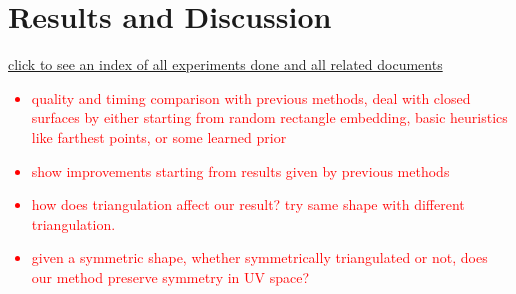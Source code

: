 \section{Results and Discussion}

\href{http://www.cs.ubc.ca/labs/imager/dgp/FracCuts/expResults/}{click to see an index of all experiments done and all related documents}

\textcolor{red}{
\begin{itemize}
\item quality and timing comparison with previous methods, deal with closed surfaces by either starting from random rectangle embedding, basic heuristics like farthest points, or some learned prior
\item show improvements starting from results given by previous methods
\item how does triangulation affect our result? try same shape with different triangulation.
\item given a symmetric shape, whether symmetrically triangulated or not, does our method preserve symmetry in UV space?
\end{itemize}
}